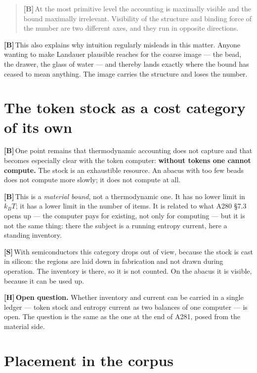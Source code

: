 \documentclass[11pt,a4paper]{article}
\newcommand{\LB}{\textcolor{layB}{\textbf{\footnotesize\textsf{[B]}}}\,}
\newcommand{\LSk}{\textcolor{layS}{\textbf{\footnotesize\textsf{[S]}}}\,}
\newcommand{\LH}{\textcolor{layH}{\textbf{\footnotesize\textsf{[H]}}}\,}
\begin{document}
\begin{quote}
\LB At the most primitive level the accounting is maximally visible and the bound
maximally irrelevant. Visibility of the structure and binding force of the number
are two different axes, and they run in opposite directions.
\end{quote}

\LB This also explains why intuition regularly misleads in this matter. Anyone
wanting to make Landauer plausible reaches for the coarse image --- the bead, the
drawer, the glass of water --- and thereby lands exactly where the bound has
ceased to mean anything. The image carries the structure and loses the number.

\section{The token stock as a cost category of its own}

\LB One point remains that thermodynamic accounting does not capture and that
becomes especially clear with the token computer: \textbf{without tokens one
cannot compute.} The stock is an exhaustible resource. An abacus with too few
beads does not compute more slowly; it does not compute at all.

\LB This is a \emph{material bound}, not a thermodynamic one. It has no lower
limit in $k_BT$; it has a lower limit in the number of items. It is related to
what A280 §7.3 opens up --- the computer pays for existing, not only for computing
--- but it is not the same thing: there the subject is a running entropy current,
here a standing inventory.

\LSk With semiconductors this category drops out of view, because the stock is
cast in silicon: the regions are laid down in fabrication and not drawn during
operation. The inventory is there, so it is not counted. On the abacus it is
visible, because it can be used up.

\LH \textbf{Open question.} Whether inventory and current can be carried in a
single ledger --- token stock and entropy current as two balances of one computer
--- is open. The question is the same as the one at the end of A281, posed from
the material side.

\section{Placement in the corpus}
\end{document}
